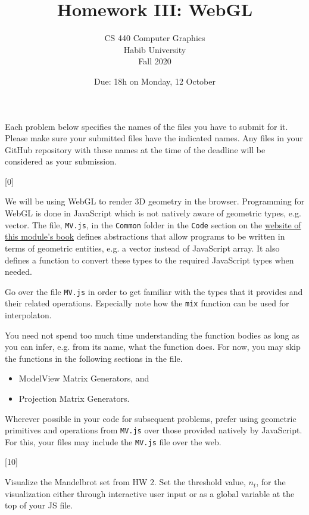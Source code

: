 \documentclass[addpoints]{exam}
\title{Homework III: WebGL}
\author{CS 440 Computer Graphics\\Habib University\\Fall 2020}
\date{Due: 18h on Monday, 12 October}
\begin{document}
\maketitle

Each problem below specifies the names of the files you have to submit for it. Please make sure your submitted files have the indicated names. Any files in your GitHub repository with these names at the time of the deadline will be considered as your submission.

\begin{questions}

  [0]

  We will be using WebGL to render 3D geometry in the browser. Programming for WebGL is done in JavaScript which is not natively aware of geometric types, e.g. vector. The file, \texttt{MV.js}, in the \texttt{Common} folder in the \texttt{Code} section on the \href{https://www.cs.unm.edu/~angel/BOOK/INTERACTIVE_COMPUTER_GRAPHICS/SEVENTH_EDITION/}{website of this module's book} defines abstractions that allow programs to be written in terms of geometric entities, e.g. a vector instead of JavaScript array. It also defines a function to convert these types to the required JavaScript types when needed. 

  Go over the file {\tt MV.js} in order to get familiar with the types that it provides and their related operations. Especially note how the \texttt{mix} function can be used for interpolaton.

  You need not spend too much time understanding the function bodies as long as you can infer, e.g. from its name, what the function does. For now, you may skip the functions in the following sections in the file.
  \begin{itemize}
  \item ModelView Matrix Generators, and
  \item Projection Matrix Generators.
  \end{itemize}

  Wherever possible in your code for subsequent problems, prefer using geometric primitives and operations from {\tt MV.js} over those provided natively by JavaScript. For this, your files may include the \texttt{MV.js} file over the web.

[10]

  Visualize the Mandelbrot set from HW 2. Set the threshold value, $n_t$, for the visualization either through interactive user input or as a global variable at the top of your JS file.
  

\end{questions}
\end{document}
